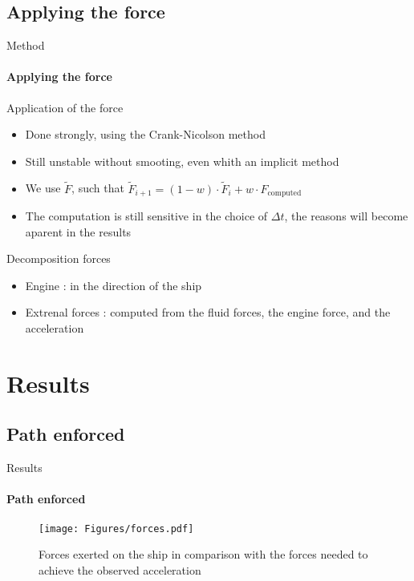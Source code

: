 \documentclass[aspectratio=169]{beamer}
\begin{document}
\subsection{Applying the force}
\begin{frame}{Method}
    \framesubtitle{Applying the force}
    Application of the force
    \begin{itemize}
        \item Done strongly, using the Crank-Nicolson method
        \item Still unstable without smooting, even whith an implicit method
        \item We use $\tilde{F}$, such that $\tilde{F}_{i+1} = (1-w) \cdot \tilde{F}_i + w \cdot F_\text{computed}$
        \item     The computation is still sensitive in the choice of $\Delta t$, the reasons will become aparent in the results
    \end{itemize}
    
    \vfill
    Decomposition forces
    \begin{itemize}
        \item Engine : in the direction of the ship
        \item Extrenal forces : computed from the fluid forces, the engine force, and the acceleration
    \end{itemize}


\end{frame}



\section{Results}
\subsection{Path enforced}
\begin{frame}{Results}
    \framesubtitle{Path enforced}

    \begin{figure}
        \centering
        \texttt{[image: Figures/forces.pdf]}
        \caption{Forces exerted on the ship in comparison with the forces needed to achieve the observed acceleration}
        \label{fig:forces}
    \end{figure}
\end{frame}
\end{document}
